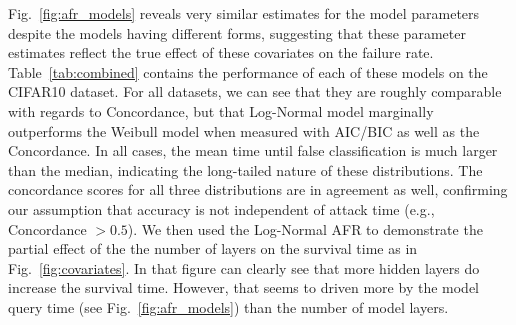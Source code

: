Fig.~\ref{fig:afr_models} reveals very similar estimates for the model parameters despite the models having different forms, suggesting that these parameter estimates reflect the true effect of these covariates on the failure rate. Table~\ref{tab:combined} contains the performance of each of these models on the CIFAR10 dataset. For all datasets, we can see that they are roughly comparable with regards to Concordance, but that Log-Normal model marginally outperforms the Weibull model when measured with AIC/BIC as well as the Concordance.
In all cases, the mean time until false classification is much larger than the median, indicating the long-tailed nature of these distributions.
The concordance scores for all three distributions are in agreement as well, confirming our assumption that accuracy is not independent of attack time (e.g., Concordance $> 0.5$).
We then used the Log-Normal AFR to demonstrate the partial effect of the the number of layers on the survival time as in Fig.~\ref{fig:covariates}. In that figure can clearly see that more hidden layers do increase the survival time. However, that seems to driven more by the model query time (see Fig.~\ref{fig:afr_models}) than the number of model layers.
